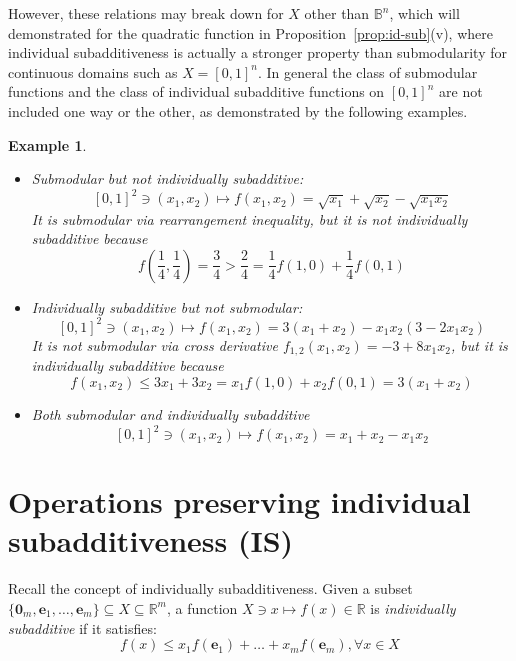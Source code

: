 \documentclass[11pt]{article}\usepackage[]{graphicx}\usepackage[]{xcolor}
\newtheorem{example}{Example}
\begin{document}
However, these relations may break down for $X$ other than $\mathbb{B}^n$, which will demonstrated for the quadratic function in Proposition~\ref{prop:id-sub}(v), where individual subadditiveness is actually a stronger property than submodularity for continuous domains such as $X=[0,1]^n$. In general the class of submodular functions and the class of individual subadditive functions on $[0,1]^n$ are not included one way or the other, as demonstrated by the following examples.
\begin{example}\label{exp:sub-is-not-included}\quad\\
\begin{itemize}
\item Submodular but not individually subadditive: 
\[
[0,1]^2\ni (x_1, x_2)\mapsto f(x_1,x_2)=\sqrt{x_1}+\sqrt{x_2}-\sqrt{x_1x_2}
\]
It is submodular via rearrangement inequality, but it is not individually subadditive because
\[
f\left(\frac{1}{4}, \frac{1}{4}\right)=\frac{3}{4}>\frac{2}{4}=\frac{1}{4}f(1,0)+\frac{1}{4}f(0,1)
\]

\item Individually subadditive but not submodular: 
\[
[0,1]^2\ni (x_1, x_2)\mapsto f(x_1,x_2)=3(x_1+x_2)-x_1x_2(3-2x_1x_2)
\]
It is not submodular via cross derivative $f_{1,2}(x_1, x_2)=-3+8x_1x_2$, 
but it is individually subadditive because
\[
f\left(x_1, x_2\right)\le 3x_1+3x_2=x_1f(1,0)+x_2f(0,1)=3(x_1+x_2)
\]
\item Both submodular and individually subadditive
\[
[0,1]^2\ni (x_1, x_2)\mapsto f(x_1,x_2)=x_1+x_2-x_1x_2
\]
\end{itemize}
\end{example}











\section{Operations preserving individual subadditiveness (IS)}\label{sec:subadd-operations-preservation}
Recall the concept of individually subadditiveness. Given a subset $\{\mathbf{0}_m, \mathbf{e}_1,\dots, \mathbf{e}_m\}\subseteq X\subseteq \mathbb{R}^m$, a function $X \ni x\mapsto f(x)\in\mathbb{R}$ is \emph{individually subadditive} if it satisfies: 
\begin{equation}\label{assump:subadditive-cont}
f(x)\le x_1f(\mathbf{e}_1)+\dots+x_mf(\mathbf{e}_m), \forall x\in X
\end{equation}
\end{document}
